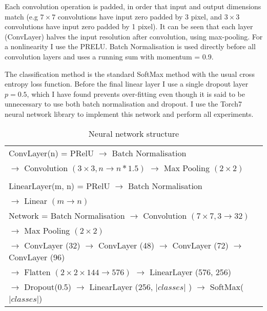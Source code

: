 Each convolution operation is padded, in order that input and output dimensions match (e.g $ 7\times7 $ convolutions have input zero padded by 3 pixel, and $3\times3$ convolutions have input zero padded by 1 pixel). It can be seen that each layer (ConvLayer) halves the input resolution after convolution, using max-pooling. For a nonlinearity I use the \gls{PRELU}. Batch Normalisation is used directly before all convolution layers and uses a running sum with momentum = 0.9.

The classification method is the standard SoftMax method with the usual cross entropy loss function. Before the final linear layer I use a single dropout layer $ p = 0.5 $, which I have found prevents over-fitting even though it is said to be unnecessary to use both batch normalisation and dropout.  I use the Torch7 \cite{Collobert2011a} neural network library to implement this network and perform all experiments. 

\begin{table}[h]
  \centering
    \caption{Neural network structure }
\begin{tabular}{ l } 

\toprule

 ConvLayer(n) = PRelU $\rightarrow$ Batch Normalisation \\ 
 $\rightarrow$  Convolution $(3\times3, n \rightarrow n * 1.5)$ $\rightarrow$  Max Pooling $(2\times2)$ \\
\\
 LinearLayer(m, n)  = PRelU $\rightarrow$ Batch Normalisation \\  $\rightarrow$  Linear $(m \rightarrow n)$ \\
\toprule
  Network = Batch Normalisation $\rightarrow$
 Convolution $(7\times7, 3 \rightarrow 32)$ \\
 $\rightarrow$ Max Pooling $(2\times2)$   \\

  $\rightarrow$ ConvLayer (32) $\rightarrow$  ConvLayer (48) $\rightarrow$ ConvLayer (72) $\rightarrow$ ConvLayer (96)   \\
  
  
  $\rightarrow$ Flatten $(2\times2\times144 \rightarrow 576)$ $\rightarrow$ LinearLayer (576, 256) \\
  
  $\rightarrow$ Dropout(0.5) $\rightarrow$ LinearLayer (256, $\vert classes \vert$ )  $\rightarrow$  SoftMax($\vert classes \vert$) \\
  
    
       
\toprule
\end{tabular}

\label{fig:focus_network}
\end{table}




